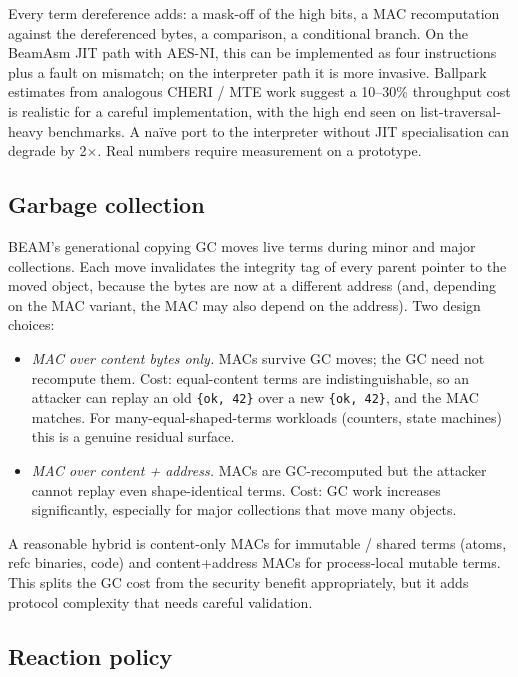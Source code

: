 \documentclass[10pt,a4paper]{article}
\begin{document}
Every term dereference adds: a mask-off of the high bits, a MAC
recomputation against the dereferenced bytes, a comparison, a
conditional branch. On the BeamAsm JIT path with AES-NI, this can be
implemented as four instructions plus a fault on mismatch; on the
interpreter path it is more invasive. Ballpark estimates from
analogous CHERI / MTE work suggest a 10--30\% throughput cost is
realistic for a careful implementation, with the high end seen on
list-traversal-heavy benchmarks. A naïve port to the interpreter
without JIT specialisation can degrade by 2$\times$. Real numbers
require measurement on a prototype.

\subsection{Garbage collection}

BEAM's generational copying GC moves live terms during minor and major
collections. Each move invalidates the integrity tag of every parent
pointer to the moved object, because the bytes are now at a different
address (and, depending on the MAC variant, the MAC may also depend on
the address). Two design choices:

\begin{itemize}[label=---]
\item \emph{MAC over content bytes only.} MACs survive GC moves; the
GC need not recompute them. Cost: equal-content terms are
indistinguishable, so an attacker can replay an old \texttt{\{ok, 42\}}
over a new \texttt{\{ok, 42\}}, and the MAC matches. For
many-equal-shaped-terms workloads (counters, state machines) this is
a genuine residual surface.
\item \emph{MAC over content + address.} MACs are GC-recomputed but the
attacker cannot replay even shape-identical terms. Cost: GC work
increases significantly, especially for major collections that move
many objects.
\end{itemize}

A reasonable hybrid is content-only MACs for immutable / shared terms
(atoms, refc binaries, code) and content+address MACs for process-local
mutable terms. This splits the GC cost from the security benefit
appropriately, but it adds protocol complexity that needs careful
validation.

\subsection{Reaction policy}
\end{document}

